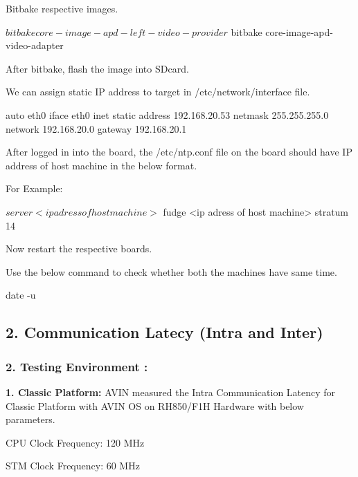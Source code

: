 \begin{DoxyEnumerate}
\item Bitbake respective images. 
\begin{DoxyCode}
$ bitbake core-image-apd-left-video-provider
$ bitbake core-image-apd-video-adapter
\end{DoxyCode}

\item After bitbake, flash the image into S\+Dcard.
\begin{DoxyEnumerate}
\item We can assign static IP address to target in /etc/network/interface file. 
\begin{DoxyCode}
auto eth0
iface eth0 inet static
      address 192.168.20.53
      netmask 255.255.255.0
      network 192.168.20.0
      gateway 192.168.20.1
\end{DoxyCode}

\end{DoxyEnumerate}
\item After logged in into the board, the /etc/ntp.conf file on the board should have IP address of host machine in the below format.

For Example\+: 
\begin{DoxyCode}
$ server <ip adress of host machine>
$ fudge <ip adress of host machine> stratum 14
\end{DoxyCode}

\item Now restart the respective boards.
\item Use the below command to check whether both the machines have same time. 
\begin{DoxyCode}
date -u
\end{DoxyCode}

\end{DoxyEnumerate}

\subsection*{2. Communication Latecy (Intra and Inter)}

\subsubsection*{2. Testing Environment \+:}

{\bfseries 1. Classic Platform\+:} A\+V\+IN measured the Intra Communication Latency for Classic Platform with A\+V\+IN OS on R\+H850/\+F1H Hardware with below parameters.


\begin{DoxyItemize}
\item C\+PU Clock Frequency\+: 120 M\+Hz
\item S\+TM Clock Frequency\+: 60 M\+Hz
\end{DoxyItemize}

